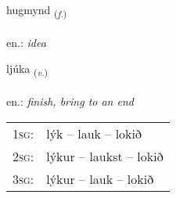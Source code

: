 \documentclass[frontgrid, backgrid]{flacards}\usepackage[]{graphicx}\usepackage[]{xcolor}
\begin{document}
\renewcommand{\blhead}{\vskip5pt {\small\bfseries\footnotesize Nafnorð | Noun }}
\renewcommand{\bcfoot}{\vskip5pt \hspace{2pt}{\small\bfseries\footnotesize 1K}}


{hugmynd \small{\textsubscript{(\textit{f.})}} \\[1ex] %
\textphonetic{[hʏɣmɪnt]} \\
en.: \emph{idea} \\  [2ex]
\renewcommand*{\arraystretch}{0.8}
}

\renewcommand{\flhead}{\vskip5pt \fboxsep=0pt {\small\bfseries\footnotesize Sagnorð | Verb}}
\renewcommand{\fcfoot}{\vskip5pt \fboxsep=0pt \hspace{2pt}{\small\bfseries\footnotesize 1K}}

\renewcommand{\blhead}{\vskip5pt {\small\bfseries\footnotesize Sagnorð | Verb }}
\renewcommand{\bcfoot}{\vskip5pt \hspace{2pt}{\small\bfseries\footnotesize 1K}}


{ljúka \small{\textsubscript{(\textit{v.})}} \\[1ex] %
\textphonetic{[ljuːka]} \\
en.: \emph{finish, bring to an end} \\  [2ex]
\renewcommand*{\arraystretch}{0.8}
\begin{tabular}{p{1cm}l}
\textsc{1sg}: & lýk -- lauk -- lokið \\ 
\textsc{2sg}: & lýkur -- laukst -- lokið \\ 
\textsc{3sg}: & lýkur -- lauk -- lokið \\ 
\end{tabular}
}

\renewcommand{\flhead}{\vskip5pt \fboxsep=0pt {\small\bfseries\footnotesize Nafnorð | Noun}}
\renewcommand{\fcfoot}{\vskip5pt \fboxsep=0pt \hspace{2pt}{\small\bfseries\footnotesize 1K}}
\end{document}
